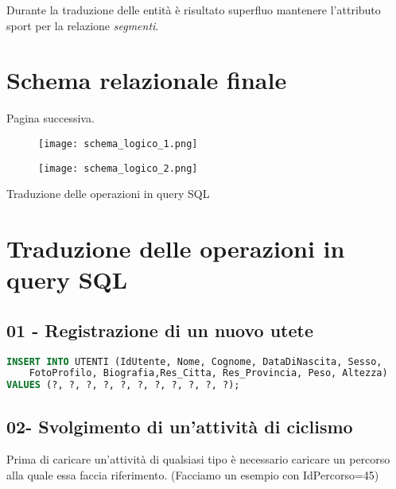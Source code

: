 \documentclass[12pt]{report}
\begin{document}
\vspace*{12pt}
Durante la traduzione delle entità è risultato superfluo mantenere l'attributo sport per la relazione \emph{segmenti}.


\section{Schema relazionale finale}
Pagina successiva.

    \begin{figure}[p]
        \centering
        \texttt{[image: schema\_logico\_1.png]}
        
    \end{figure}
    
    \begin{figure}[p]
        \centering
        \texttt{[image: schema\_logico\_2.png]}
    \end{figure}
    Traduzione delle operazioni in query SQL
\restoregeometry



\section{Traduzione delle operazioni in query SQL}

\subsection*{01 - Registrazione di un nuovo utete}

\begin{lstlisting}[style=sql, style=sql, language=SQL, label=lst:sql-query]
INSERT INTO UTENTI (IdUtente, Nome, Cognome, DataDiNascita, Sesso, 
    FotoProfilo, Biografia,Res_Citta, Res_Provincia, Peso, Altezza)
VALUES (?, ?, ?, ?, ?, ?, ?, ?, ?, ?, ?);
\end{lstlisting}
    

\subsection*{02- Svolgimento di un’attività di ciclismo}
Prima di caricare un'attività di qualsiasi tipo è necessario caricare un percorso
alla quale essa faccia riferimento. (Facciamo un esempio con IdPercorso=45)
\end{document}
